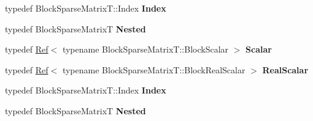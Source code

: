 \begin{DoxyCompactItemize}
\item 
\mbox{\label{class_eigen_1_1_block_sparse_matrix_view_aa5b3412e04a2fa624ef837e7f29e2626}} 
typedef Block\+Sparse\+Matrix\+T\+::\+Index {\bfseries Index}
\item 
\mbox{\label{class_eigen_1_1_block_sparse_matrix_view_a72ca595f9b73ec2949b62bc78beaadc0}} 
typedef Block\+Sparse\+MatrixT {\bfseries Nested}
\item 
\mbox{\label{class_eigen_1_1_block_sparse_matrix_view_a854f8029ce3db3acf6910cbaaa173985}} 
typedef \hyperlink{group___core___module_class_eigen_1_1_ref}{Ref}$<$ typename Block\+Sparse\+Matrix\+T\+::\+Block\+Scalar $>$ {\bfseries Scalar}
\item 
\mbox{\label{class_eigen_1_1_block_sparse_matrix_view_af67277170d4172bbe3cc899755bcef47}} 
typedef \hyperlink{group___core___module_class_eigen_1_1_ref}{Ref}$<$ typename Block\+Sparse\+Matrix\+T\+::\+Block\+Real\+Scalar $>$ {\bfseries Real\+Scalar}
\item 
\mbox{\label{class_eigen_1_1_block_sparse_matrix_view_aa5b3412e04a2fa624ef837e7f29e2626}} 
typedef Block\+Sparse\+Matrix\+T\+::\+Index {\bfseries Index}
\item 
\mbox{\label{class_eigen_1_1_block_sparse_matrix_view_a72ca595f9b73ec2949b62bc78beaadc0}} 
typedef Block\+Sparse\+MatrixT {\bfseries Nested}
\end{DoxyCompactItemize}
